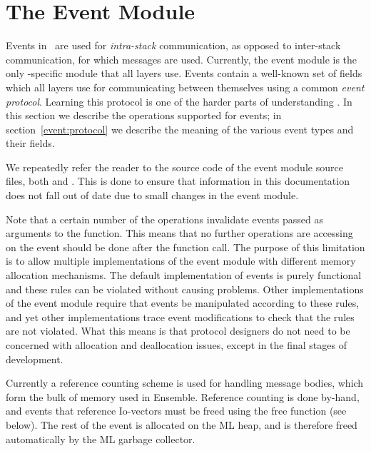 %
%
%
\section{The Event Module}
\label{event:module}

Events in \ensemble\ are used for \emph{intra-stack} communication, as opposed
to inter-stack communication, for which messages are used.  Currently, the
event module is the only \ensemble-specific module that all layers use.
Events contain a well-known set of fields which all layers use for
communicating between themselves using a common \emph{event protocol}.
Learning this protocol is one of the harder parts of understanding \ensemble.
In this section we describe the operations supported for events; in
section~\ref{event:protocol} we describe the meaning of the various event
types and their fields.

We repeatedly refer the reader to the source code of the event module source
files, both  and .  This is done to
ensure that information in this documentation does not fall out of date due to
small changes in the event module.

Note that a certain number of the operations invalidate events passed
as arguments to the function.  This means that no further operations
are accessing on the event should be done after the function call.
The purpose of this limitation is to allow multiple implementations of
the event module with different memory allocation mechanisms.  The
default implementation of events is purely functional and these rules
can be violated without causing problems.  Other implementations of
the event module require that events be manipulated according to these
rules, and yet other implementations trace event modifications to
check that the rules are not violated.  What this means is that
protocol designers do not need to be concerned with allocation and
deallocation issues, except in the final stages of development.

Currently a reference counting scheme is used for handling message
bodies, which form the bulk of memory used in Ensemble. Reference
counting is done by-hand, and events that reference Io-vectors
must be freed using the free function (see below). The rest of the
event is allocated on the ML heap, and is therefore freed
automatically by the ML garbage collector.

